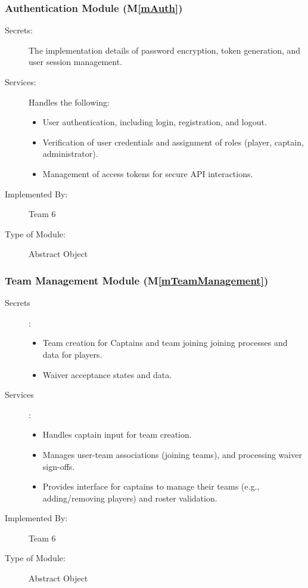 \documentclass[12pt, titlepage]{article}
\newcommand{\mref}[1]{M\ref{#1}}
\begin{document}
\subsubsection{Authentication Module (\mref{mAuth})}

\begin{description}
\item[Secrets:] The implementation details of password encryption, token generation, and user session management.

\item[Services:] Handles the following:
  \begin{itemize}
    \item User authentication, including login, registration, and logout.
    \item Verification of user credentials and assignment of roles (player, captain, administrator).
    \item Management of access tokens for secure API interactions.
  \end{itemize}

\item[Implemented By:] Team 6

\item[Type of Module:] Abstract Object
\end{description}

\subsubsection{Team Management Module (\mref{mTeamManagement})}

\begin{description}
\item[Secrets]: 
    \begin{itemize}
        \item Team creation for Captains and team joining joining processes and data for players.
        \item Waiver acceptance states and data.
    \end{itemize}
    
\item[Services]: 
    \begin{itemize}
        \item Handles captain input for team creation.
        \item Manages user-team associations (joining teams), and processing waiver sign-offs.
        \item Provides interface for captains to manage their teams (e.g., adding/removing players) and roster validation.
    \end{itemize}

\item[Implemented By:] Team 6
    
\item[Type of Module:] Abstract Object
\end{description}
\end{document}

